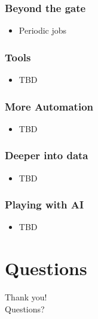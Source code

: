 \documentclass[aspectratio=169,11pt,hyperref={colorlinks=true}]{beamer}
\begin{document}
\begin{frame}
    \frametitle{Beyond the gate}
    \begin{itemize}
        \item{Periodic jobs}
    \end{itemize}
\end{frame}

\begin{frame}
    \frametitle{Tools}
    \begin{itemize}
        \item{TBD}
    \end{itemize}
\end{frame}

\begin{frame}
    \frametitle{More Automation}
    \begin{itemize}
        \item{TBD}
    \end{itemize}
\end{frame}

\begin{frame}
    \frametitle{Deeper into data}
    \begin{itemize}
        \item{TBD}
    \end{itemize}
\end{frame}

\begin{frame}
    \frametitle{Playing with AI}
    \begin{itemize}
        \item{TBD}
    \end{itemize}
\end{frame}

\section{Questions}
\begin{frame}[c]
    \begin{center}
        \Huge Thank you!\\Questions?
    \end{center}
\end{frame}
\end{document}

